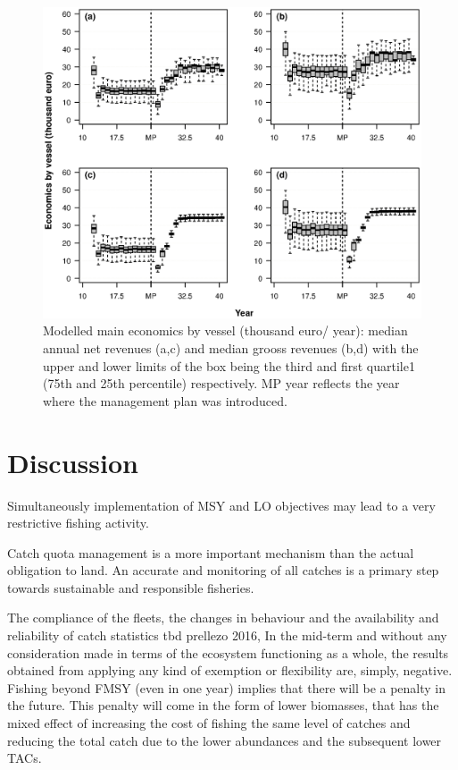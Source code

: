 \documentclass[12pt,oneline,a4paper,numbib]{ouparticle}
\numberwithin{equation}{subsection} %
\begin{document}
\begin{figure}[!ht]
\centering
\includegraphics[width=\textwidth]{Figures/Mean_Economics.eps} 
\caption{Modelled main economics by vessel (thousand euro/ year): median annual net revenues (a,c) and median grooss revenues (b,d) with the upper and lower limits of the box being the third and first quartile1 (75th and 25th percentile) respectively. MP year reflects the year where the management plan was introduced.}
\label{f:meanecon}
\end{figure}

\clearpage

\section{Discussion}

Simultaneously implementation of MSY and LO objectives may lead to a very restrictive fishing activity.

Catch quota management is a more important mechanism than the actual obligation to land. An accurate and monitoring of all catches is a primary step towards sustainable and responsible fisheries.

The compliance of the fleets, the changes in behaviour and the availability and reliability of catch statistics
tbd
prellezo 2016, In the mid-term and without any consideration made in terms of the ecosystem functioning as a whole, the results obtained from applying any kind of exemption or flexibility are, simply, negative. Fishing beyond FMSY (even in one year) implies that there will be a penalty in the future. This penalty will come in the form of lower biomasses, that has the mixed effect of increasing the cost of fishing the same level of catches and reducing the total catch due to the lower abundances and the subsequent lower TACs.
\end{document}
